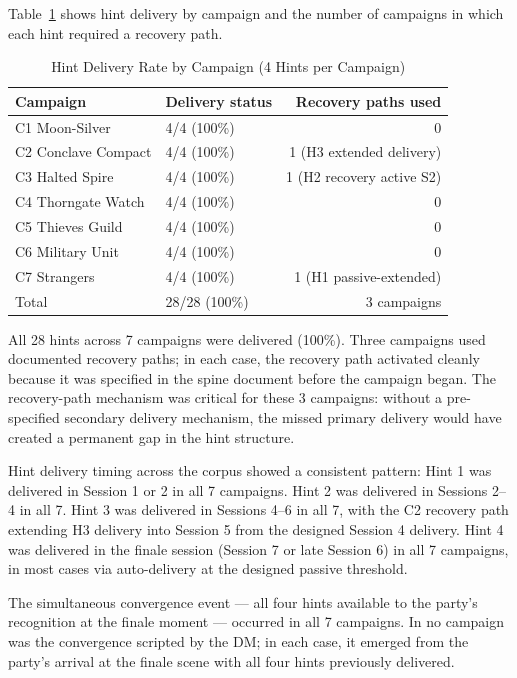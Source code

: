 Table~\ref{tab:hints} shows hint delivery by campaign and the number of campaigns
in which each hint required a recovery path.

\begin{table}[t]
\caption{Hint Delivery Rate by Campaign (4 Hints per Campaign)}
\label{tab:hints}
\begin{tabular}{@{}llr@{}}
\toprule
Campaign & Delivery status & Recovery paths used \\
\midrule
C1 Moon-Silver & 4/4 (100\%) & 0 \\
C2 Conclave Compact & 4/4 (100\%) & 1 (H3 extended delivery) \\
C3 Halted Spire & 4/4 (100\%) & 1 (H2 recovery active S2) \\
C4 Thorngate Watch & 4/4 (100\%) & 0 \\
C5 Thieves Guild & 4/4 (100\%) & 0 \\
C6 Military Unit & 4/4 (100\%) & 0 \\
C7 Strangers & 4/4 (100\%) & 1 (H1 passive-extended) \\
\midrule
Total & 28/28 (100\%) & 3 campaigns \\
\bottomrule
\end{tabular}
\end{table}

All 28 hints across 7 campaigns were delivered (100\%). Three campaigns used
documented recovery paths; in each case, the recovery path activated cleanly
because it was specified in the spine document before the campaign began. The
recovery-path mechanism was critical for these 3 campaigns: without a pre-specified
secondary delivery mechanism, the missed primary delivery would have created a
permanent gap in the hint structure.

Hint delivery timing across the corpus showed a consistent pattern:
Hint 1 was delivered in Session 1 or 2 in all 7 campaigns.
Hint 2 was delivered in Sessions 2--4 in all 7.
Hint 3 was delivered in Sessions 4--6 in all 7, with the C2 recovery path
extending H3 delivery into Session 5 from the designed Session 4 delivery.
Hint 4 was delivered in the finale session (Session 7 or late Session 6) in
all 7 campaigns, in most cases via auto-delivery at the designed passive threshold.

The simultaneous convergence event --- all four hints available to the party's
recognition at the finale moment --- occurred in all 7 campaigns. In no campaign
was the convergence scripted by the DM; in each case, it emerged from the party's
arrival at the finale scene with all four hints previously delivered.

